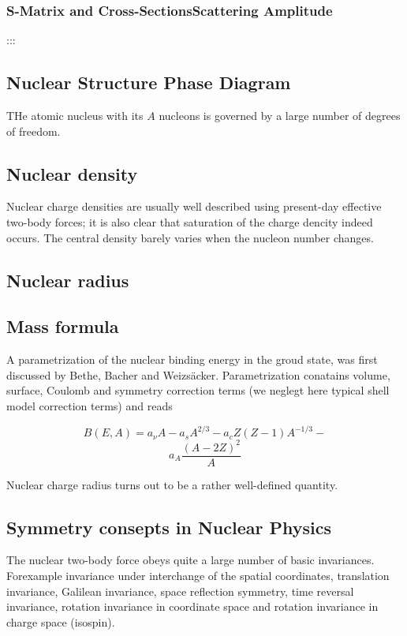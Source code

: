 \subsubsection{S-Matrix and Cross-SectionsScattering Amplitude}

 ::: \cite{iljinov94}


\subsection{Nuclear Structure Phase Diagram}

THe atomic nucleus with its $A$ nucleons is governed by a large number of degrees of freedom.

\subsection{Nuclear density}

Nuclear charge densities are usually well described using present-day effective two-body forces; it is also clear that saturation of the charge dencity indeed occurs. 
The central density barely varies when the nucleon number changes.
\subsection{Nuclear radius}

\subsection{Mass formula}

A parametrization of the nuclear binding energy in the groud state,
was first discussed by Bethe, Bacher and Weizs\"{a}cker.
Parametrization conatains volume, surface, Coulomb and symmetry correction terms (we neglegt here typical shell model correction terms) and reads

$$B(E, A) = a_{\nu} A - a_{s} A^{2/3} - a_{c} Z(Z-1)A^{-1/3} -$$ 
\begin{equation}
  a_{A}\frac{(A-2Z)^2}{A}
\end{equation}

Nuclear charge radius turns out to be a rather well-defined quantity.

\subsection{Symmetry consepts in Nuclear Physics}
The nuclear two-body force obeys quite a large number of basic invariances.
Forexample invariance under interchange of the spatial coordinates, translation invariance, Galilean invariance, space reflection symmetry, time reversal invariance, rotation invariance in coordinate space and rotation invariance in charge space (isospin).

